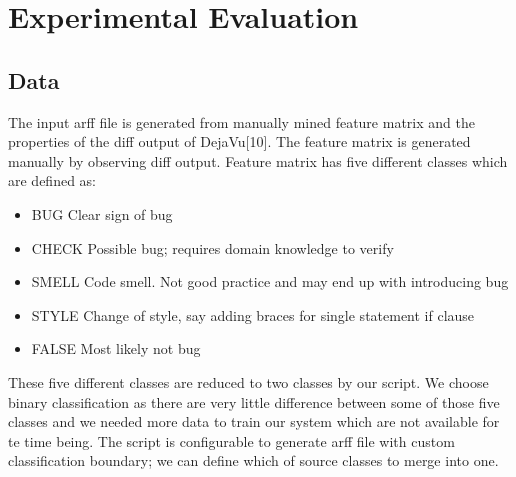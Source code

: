 \documentclass[11pt]{article}
\begin{document}

\section{Experimental Evaluation}
\subsection{Data}
The input arff file is generated from manually mined feature matrix and the properties of the diff output of DejaVu[10]. The feature matrix is generated manually by observing diff output. Feature matrix has five different classes which are defined as:

\begin{itemize}
\item BUG		Clear sign of bug
\item CHECK	Possible bug; requires domain knowledge to verify
\item SMELL	Code smell. Not good practice and may end up with introducing bug
\item STYLE     	Change of style, say adding braces for single statement if clause
\item FALSE     	Most likely not bug
\end{itemize}

\vspace{10 pt}
\noindent
These five different classes are reduced to two classes by our script. We choose binary classification as there are very little difference between some of those five classes and we needed more data to train our system which are not available for te time being. The script is configurable to generate arff file with custom classification boundary; we can define which of source classes to merge into one.
\end{document}
